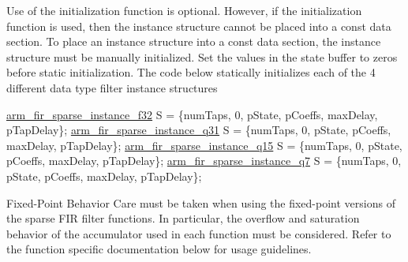 \begin{DoxyParagraph}{}
Use of the initialization function is optional. However, if the initialization function is used, then the instance structure cannot be placed into a const data section. To place an instance structure into a const data section, the instance structure must be manually initialized. Set the values in the state buffer to zeros before static initialization. The code below statically initializes each of the 4 different data type filter instance structures 
\begin{DoxyPre}   
\hyperlink{structarm__fir__sparse__instance__f32}{arm\_fir\_sparse\_instance\_f32} S = \{numTaps, 0, pState, pCoeffs, maxDelay, pTapDelay\};   
\hyperlink{structarm__fir__sparse__instance__q31}{arm\_fir\_sparse\_instance\_q31} S = \{numTaps, 0, pState, pCoeffs, maxDelay, pTapDelay\};   
\hyperlink{structarm__fir__sparse__instance__q15}{arm\_fir\_sparse\_instance\_q15} S = \{numTaps, 0, pState, pCoeffs, maxDelay, pTapDelay\};   
\hyperlink{structarm__fir__sparse__instance__q7}{arm\_fir\_sparse\_instance\_q7} S =  \{numTaps, 0, pState, pCoeffs, maxDelay, pTapDelay\};   
 \end{DoxyPre}
 
\end{DoxyParagraph}
\begin{DoxyParagraph}{}

\end{DoxyParagraph}
\begin{DoxyParagraph}{Fixed-\/\-Point Behavior }
Care must be taken when using the fixed-\/point versions of the sparse F\-I\-R filter functions. In particular, the overflow and saturation behavior of the accumulator used in each function must be considered. Refer to the function specific documentation below for usage guidelines. 
\end{DoxyParagraph}


